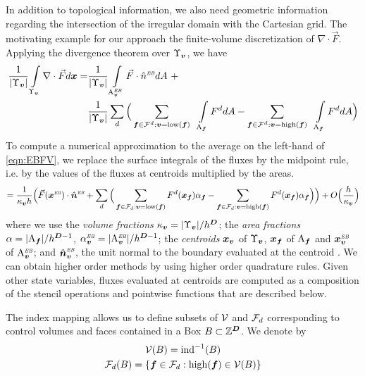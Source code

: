 \documentclass[12pt]{article}
\newcommand{\ind}{{\rm{ind}}}
\newcommand{\low}{{\rm{low}}}
\newcommand{\high}{{\rm{high}}}
\newcommand{\vol}[1]{{\Upsilon_{#1}}}
\newcommand{\area}[1]{{\rm{A}_{#1}}}
\newcommand{\vof}{{\mbf{v}}}
\newcommand{\face}{{\mbf{f}}}
\newcommand{\lr}[1]{{\langle #1 \rangle}}
\newcommand{\ebsub}{{\text{\it \tiny EB}}}
\newcommand{\areaEB}[1]{{{\rm A}_{#1}^{\ebsub}}}
\begin{document}
In addition to topological information, we also need geometric information regarding the intersection of the irregular domain with the Cartesian grid. The motivating example for our approach the finite-volume discretization of $\nabla \cdot \vec{F}$. Applying the divergence theorem over $\vol{\vof}$, we have
\begin{align}
\frac{1}{|\vol{\vof}|} \int \limits_{\vol{\vof} } \nabla \cdot \vec{F} d \mbf{x} =  & \frac{1}{|\vol{\vof}|} \int \limits_{\areaEB{\vof}} \vec{F} \cdot \hat{n}^\ebsub d A ~ +  \nonumber
\\ & \frac{1}{|\vol{\vof}|} \sum \limits_d \Big ( \sum \limits_{\face \in \mcl{F}^d:\vof = \low(\face)} ~~ \int \limits_{\area{\face}} F^d dA -  \sum \limits_{\face \in \mcl{F}^d :\vof = \high(\face)}  ~~ \int \limits_{\area{\face}} F^d dA \Big )\label{eqn:EBFV} 
\end{align}
To compute a numerical approximation to the average on the left-hand of \eqref{eqn:EBFV}, we replace the surface integrals of the fluxes by the midpoint rule, i.e. by the values of the fluxes at centroids multiplied by the areas. 
\begin{gather*}
= \frac{1}{\kappa_\vof h}\Big( \vec{F}(\mbf{x}^\ebsub ) \cdot \hat{\mbf{n}}^\ebsub +
\sum \limits_d \Big ( \sum \limits_{\face \in \mcl{F}_d:\vof = \low(\face)} F^d (\mbf{x}_\face ) \alpha_\face -  \sum \limits_{\face \in \mcl{F}_d :\vof = \high(\face)}   F^d (\mbf{x}_\face ) \alpha_\face \Big ) \Big ) + O \Big(\frac{h}{\kappa_\vof} \Big)
\end{gather*}
where we use the {\it volume fractions} $\kappa_\vof = |\vol{\vof} |/h^\DIM$; the {\it area fractions} $\alpha = | \area{\face} | / h^{\DIM-1}$, $\alpha_{\vof}^\ebsub = |\areaEB{\vof} | /  h^{\DIM-1}$; the {\it centroids} $\mbf{x}_\vof$ of $\Upsilon_\vof$,  $\mbf{x}_\face$ of $\area{\face}$ and $\mbf{x}_{\vof}^\ebsub$ of $\areaEB{\vof}$; and $\hat{\mbf{n}}_{\vof}^\ebsub$, the unit normal to the boundary evaluated at the centroid . We can obtain higher order methods by using higher order quadrature rules. Given other state variables, fluxes evaluated at centroids are computed as a composition of the stencil operations and pointwise functions that are described below.

The index mapping allows us to define subsets of ${\mathcal{V}}$ and ${\mathcal{F}}_d$ corresponding to control volumes and faces contained in a Box $B \subset \mathbb{Z}^{\boldsymbol{D}}$. We denote by 
\begin{gather*}
\mcl{V}(B) = \ind^{-1} (B) \\
\mcl{F}_d (B) = \{\face \in \mcl{F}_d: \high (\face ) \in \mcl{V}(B) \}
\end{gather*}
\end{document}
